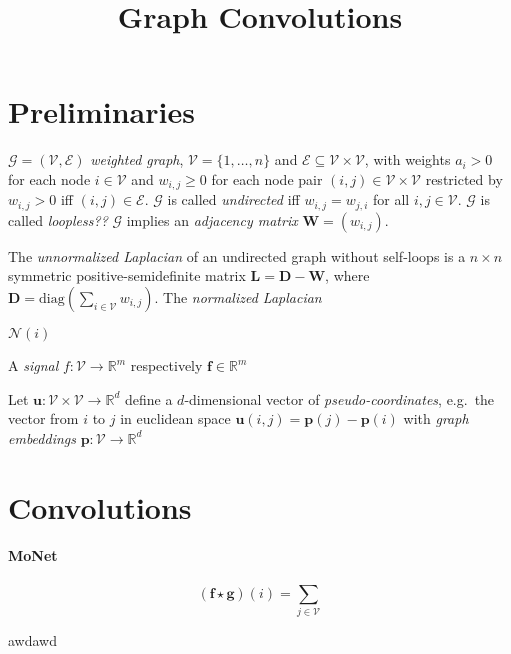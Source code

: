 \documentclass[pdftex,10pt,a4paper]{scrartcl}
\title{Graph Convolutions}
\date{\vspace{-5ex}}
\begin{document}
\maketitle

\section{Preliminaries}

$\mathcal{G} = (\mathcal{V}, \mathcal{E})$ \emph{weighted graph}, $\mathcal{V} = \{1, \ldots, n\}$ and $\mathcal{E} \subseteq \mathcal{V} \times \mathcal{V}$, with weights $a_i > 0$ for each node $i \in \mathcal{V}$ and $w_{i,j} \geq 0$ for each node pair $(i, j) \in \mathcal{V} \times \mathcal{V}$ restricted by $w_{i,j} > 0$ iff $(i, j) \in \mathcal{E}$.
$\mathcal{G}$ is called \emph{undirected} iff $w_{i,j} = w_{j,i}$ for all $i,j \in \mathcal{V}$.
$\mathcal{G}$ is called \emph{loopless??}
$\mathcal{G}$ implies an \emph{adjacency matrix} $\mathbf{W} = \left( w_{i,j} \right)$.

The \emph{unnormalized Laplacian} of an undirected graph without self-loops is a $n \times n$ symmetric positive-semidefinite matrix $\mathbf{L} = \mathbf{D} - \mathbf{W}$, where $\mathbf{D} = \mathrm{diag}\left( \sum_{i \in \mathcal{V}} w_{i,j}\right)$.
The \emph{normalized Laplacian}

$\mathcal{N}(i)$

A \emph{signal} $f \colon \mathcal{V} \to \mathbb{R}^m$ respectively $\mathbf{f} \in \mathbb{R}^m$

Let $\mathbf{u} \colon \mathcal{V} \times \mathcal{V} \to \mathbb{R}^d$ define a $d$-dimensional vector of \emph{pseudo-coordinates}, e.g.\ the vector from $i$ to $j$ in euclidean space $\mathbf{u}(i,j) = \mathbf{p}(j) - \mathbf{p}(i)$ with \emph{graph embeddings} $\mathbf{p} \colon \mathcal{V} \to \mathbb{R}^d$

\section{Convolutions}

\paragraph{MoNet}

\begin{equation*}
  (\mathbf{f} \star \mathbf{g})(i) = \sum_{j \in \mathcal{V}}
\end{equation*}



awdawd
\end{document}
